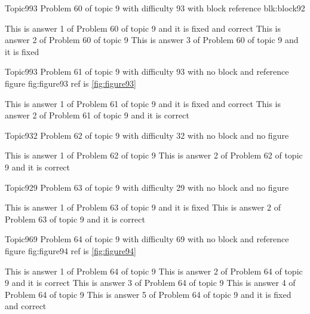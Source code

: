 \documentclass[master]{exam}
\begin{document}
\begin{problem}[requires=blk:block92]{Topic9}{93}
	Problem 60 of topic 9 with difficulty 93 with block reference blk:block92
	\begin{answers}
		 This is answer 1 of Problem 60 of topic 9 and it is fixed and correct
		\answer This is answer 2 of Problem 60 of topic 9 
		\answer[fixed] This is answer 3 of Problem 60 of topic 9 and it is fixed
	\end{answers}
\end{problem}

\begin{problem}{Topic9}{93}
	Problem 61 of topic 9 with difficulty 93 with no block and reference figure fig:figure93 ref is \ref{fig:figure93}
	\begin{answers}
		 This is answer 1 of Problem 61 of topic 9 and it is fixed and correct
		\answer[correct] This is answer 2 of Problem 61 of topic 9 and it is correct
	\end{answers}
\end{problem}

\begin{problem}{Topic9}{32}
	Problem 62 of topic 9 with difficulty 32 with no block and no figure
	\begin{answers}
		\answer This is answer 1 of Problem 62 of topic 9 
		\answer[correct] This is answer 2 of Problem 62 of topic 9 and it is correct
	\end{answers}
\end{problem}

\begin{problem}{Topic9}{29}
	Problem 63 of topic 9 with difficulty 29 with no block and no figure
	\begin{answers}
		\answer[fixed] This is answer 1 of Problem 63 of topic 9 and it is fixed
		\answer[correct] This is answer 2 of Problem 63 of topic 9 and it is correct
	\end{answers}
\end{problem}

\begin{problem}{Topic9}{69}
	Problem 64 of topic 9 with difficulty 69 with no block and reference figure fig:figure94 ref is \ref{fig:figure94}
	\begin{answers}
		\answer This is answer 1 of Problem 64 of topic 9 
		\answer[correct] This is answer 2 of Problem 64 of topic 9 and it is correct
		\answer This is answer 3 of Problem 64 of topic 9 
		\answer This is answer 4 of Problem 64 of topic 9 
		 This is answer 5 of Problem 64 of topic 9 and it is fixed and correct
	\end{answers}
\end{problem}
\end{document}
